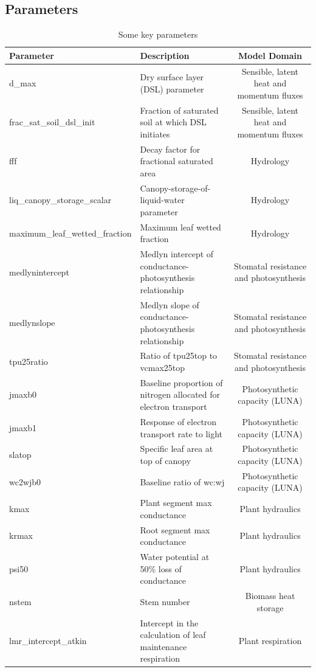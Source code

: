 \documentclass[draft]{agujournal2019}
\begin{document}
\subsection{Parameters} 
\begin{landscape}
 \begin{table}[h]
 \caption{Some key parameters}
 \centering
 \begin{tabular}{l l c}
 \hline
  Parameter  & Description & Model Domain \\
 \hline
d\_max & Dry surface layer (DSL) parameter & Sensible, latent heat and momentum fluxes \\
frac\_sat\_soil\_dsl\_init & Fraction of saturated soil at which DSL initiates & Sensible, latent heat and momentum fluxes \\
fff & Decay factor for fractional saturated area & Hydrology \\
liq\_canopy\_storage\_scalar & Canopy-storage-of-liquid-water parameter & Hydrology \\
maximum\_leaf\_wetted\_fraction & Maximum leaf wetted fraction & Hydrology \\
medlynintercept & Medlyn intercept of conductance-photosynthesis relationship & Stomatal resistance and photosynthesis \\
medlynslope & Medlyn slope of conductance-photosynthesis relationship & Stomatal resistance and photosynthesis \\
tpu25ratio & Ratio of tpu25top to vcmax25top & Stomatal resistance and photosynthesis \\
jmaxb0 & Baseline proportion of nitrogen allocated for electron transport & Photosynthetic capacity (LUNA) \\
jmaxb1 & Response of electron transport rate to light & Photosynthetic capacity (LUNA) \\
slatop & Specific leaf area at top of canopy & Photosynthetic capacity (LUNA) \\
wc2wjb0 & Baseline ratio of wc:wj & Photosynthetic capacity (LUNA) \\
kmax & Plant segment max conductance & Plant hydraulics \\
krmax & Root segment max conductance & Plant hydraulics \\
psi50 & Water potential at 50\% loss of conductance & Plant hydraulics \\
nstem & Stem number & Biomass heat storage \\
lmr\_intercept\_atkin & Intercept in the calculation of leaf maintenance respiration& Plant respiration \\

\end{tabular}
\end{table}
\end{landscape}
\end{document}
